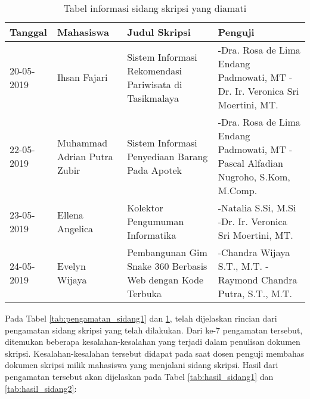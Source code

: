 \begin{table}[H]
	\renewcommand{\arraystretch}{1.5}
	\caption {Tabel informasi sidang skripsi yang diamati} 	
	\label{tab:pengamatan_sidang2}
	\begin{center}
		\begin{tabular}{|p{2 cm}|>{\raggedright} p{3.5 cm}| p{4.5 cm}| p{4.5 cm}|}
		\hline
		Tanggal & Mahasiswa & Judul Skripsi & Penguji \\ 
		\hline 
		20-05-2019 & Ihsan Fajari & Sistem Informasi Rekomendasi Pariwisata di Tasikmalaya & -Dra. Rosa de Lima Endang Padmowati, MT \newline -Dr. Ir. Veronica Sri Moertini, MT. \newline \\ 
		\hline 
		22-05-2019 & Muhammad Adrian Putra Zubir & Sistem Informasi Penyediaan Barang Pada Apotek & -Dra. Rosa de Lima Endang Padmowati, MT \newline -Pascal Alfadian Nugroho, S.Kom, M.Comp. \newline \\ 
		\hline 
		23-05-2019 & Ellena Angelica & Kolektor Pengumuman Informatika & -Natalia S.Si, M.Si \newline -Dr. Ir. Veronica Sri Moertini, MT. \newline \\ 
		\hline 
		24-05-2019 & Evelyn Wijaya & Pembangunan Gim Snake 360 Berbasis Web dengan Kode Terbuka & -Chandra Wijaya S.T., M.T. \newline -Raymond Chandra Putra, S.T., M.T. \newline \\ 
		\hline 
		\end{tabular}
	\end{center}
\end{table}

Pada Tabel \ref{tab:pengamatan_sidang1} dan \ref{tab:pengamatan_sidang2}, telah dijelaskan rincian dari pengamatan sidang skripsi yang telah dilakukan. Dari ke-7 pengamatan tersebut, ditemukan beberapa kesalahan-kesalahan yang terjadi dalam penulisan dokumen skripsi. Kesalahan-kesalahan tersebut didapat pada saat dosen penguji membahas dokumen skripsi milik mahasiswa yang menjalani sidang skripsi. Hasil dari pengamatan tersebut akan dijelaskan pada Tabel \ref{tab:hasil_sidang1} dan \ref{tab:hasil_sidang2}:

